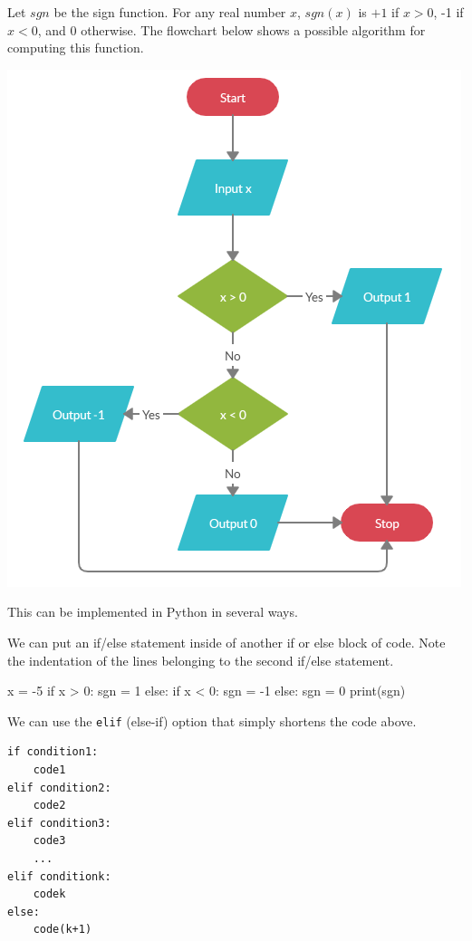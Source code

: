 \documentclass{ximera}
\begin{document}
Let $sgn$ be the sign function. For any real number $x$, $sgn(x)$ is $+1$ if $x>0$, -1 if $x<0$, and $0$ otherwise. The flowchart below shows a possible algorithm for computing this function.

\begin{center}
	\includegraphics{signfun.png}
\end{center}

This can be implemented in Python in several ways. 

We can put an if/else statement inside of another if or else block of code. Note the indentation of the lines belonging to the second if/else statement.

\begin{sageCell}
x = -5
if x > 0:
	sgn = 1
else:
	if x < 0:
		sgn = -1
	else:
		sgn = 0
print(sgn)
\end{sageCell}
	
We can use the \verb|elif| (else-if) option that simply shortens the code above.

\begin{verbatim}
if condition1:
	code1
elif condition2:
	code2
elif condition3:
	code3
    ...
elif conditionk:
	codek
else:
	code(k+1)
\end{verbatim}
\end{document}
